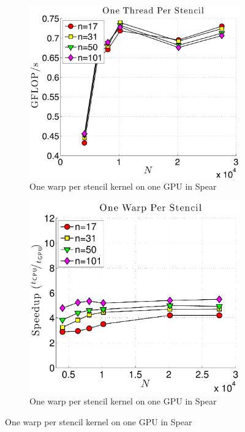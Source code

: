 \begin{figure}
\centering
\begin{subfigure}[t]{0.425\textwidth}
\includegraphics[width=1.0\textwidth]{../figures/spear_results/vortex/gflops_gpu_1proc_oneThreadPerStencil.pdf}
\caption{One warp per stencil kernel on one GPU in Spear}
\label{fig:spaer_alltoall_1proc_warp}
\end{subfigure} 
\begin{subfigure}[t]{0.425\textwidth}
\includegraphics[width=1.0\textwidth]{../figures/spear_results/vortex/speedup_1proc_oneWarpPerStencil-eps-converted-to.pdf}
\caption{One warp per stencil kernel on one GPU in Spear}
\label{fig:spear_alltoall_1proc_warp}
\end{subfigure} 
\end{figure}
